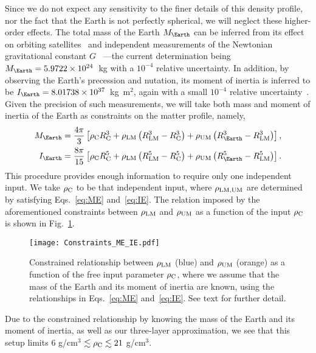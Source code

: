 Since we do not expect any sensitivity to the finer details of this density profile, nor the fact that the Earth is not perfectly spherical, we will neglect these higher-order effects. 
The total mass of the Earth $M_\Earth$ can be inferred from its effect on orbiting satellites~\cite{ries1992progress} and independent measurements of the Newtonian gravitational constant $G$~\cite{Rosi:2014kva} ---the current determination being $M_\Earth = 5.9722\times10^{24}$~kg with a $10^{-4}$ relative uncertainty.
In addition, by observing the Earth's precession and nutation, its moment of inertia is inferred to be $I_\Earth=8.01738\times10^{37}$~kg~m$^2$, again with a small $10^{-4}$ relative uncertainty~\cite{williams1994contributions, chen2015consistent}.
Given the precision of such measurements, we will take both mass and moment of inertia of the Earth as constraints on the matter profile, namely,
\begin{align}
M_\Earth &= \frac{4\pi}{3}\left[ \rho_{\rm C} R_{\rm C}^3 + \rho_{\rm LM} \left(R_{\rm LM}^3 - R_{\rm C}^3\right) + \rho_{\rm UM} \left(R_\Earth^3 - R_{\rm LM}^3\right)\right], \label{eq:ME}\\
I_\Earth &= \frac{8\pi}{15}\left[ \rho_{\rm C} R_{\rm C}^5 + \rho_{\rm LM} \left(R_{\rm LM}^5 - R_{\rm C}^5\right) + \rho_{\rm UM} \left(R_\Earth^5 - R_{\rm LM}^5\right)\right].\label{eq:IE}
\end{align}
This procedure provides enough information to require only one independent input. 
We take $\rho_{\rm C}$ to be that independent input, where $\rho_{\rm LM,UM}$ are determined by satisfying Eqs.~\eqref{eq:ME} and~\eqref{eq:IE}. 
The relation imposed by the aforementioned constraints between $\rho_{\rm LM}$ and $\rho_{\rm UM}$ as a function of the input $\rho_{\rm C}$ is shown in Fig.~\ref{fig:MEIEConstraints}.
\begin{figure}
\begin{center}
\texttt{[image: Constraints\_ME\_IE.pdf]}
\caption{Constrained relationship between $\rho_{\rm LM}$ (blue) and $\rho_{\rm UM}$ (orange) as a function of the free input parameter $\rho_{\rm C}$, where we assume that the mass of the Earth and its moment of inertia are known, using the relationships in Eqs.~\eqref{eq:ME} and~\eqref{eq:IE}. See text for further detail.\label{fig:MEIEConstraints}}
\end{center}
\end{figure}
Due to the constrained relationship by knowing the mass of the Earth and its moment of inertia, as well as our three-layer approximation, we see that this setup limits $6$ g/cm$^3$ $\lesssim \rho_{\rm C} \lesssim 21$ g/cm$^3$.

